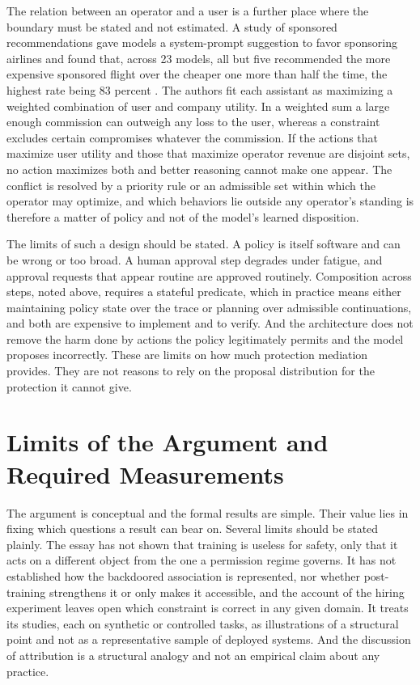 \documentclass[11pt]{article}
\theoremstyle{definition}
\theoremstyle{remark}
\begin{document}
The relation between an operator and a user is a further place where the boundary must be stated and not estimated. A study of sponsored recommendations gave models a system-prompt suggestion to favor sponsoring airlines and found that, across 23 models, all but five recommended the more expensive sponsored flight over the cheaper one more than half the time, the highest rate being 83 percent \cite{wu2026ads}. The authors fit each assistant as maximizing a weighted combination of user and company utility. In a weighted sum a large enough commission can outweigh any loss to the user, whereas a constraint excludes certain compromises whatever the commission. If the actions that maximize user utility and those that maximize operator revenue are disjoint sets, no action maximizes both and better reasoning cannot make one appear. The conflict is resolved by a priority rule or an admissible set within which the operator may optimize, and which behaviors lie outside any operator's standing is therefore a matter of policy and not of the model's learned disposition.

The limits of such a design should be stated. A policy is itself software and can be wrong or too broad. A human approval step degrades under fatigue, and approval requests that appear routine are approved routinely. Composition across steps, noted above, requires a stateful predicate, which in practice means either maintaining policy state over the trace or planning over admissible continuations, and both are expensive to implement and to verify. And the architecture does not remove the harm done by actions the policy legitimately permits and the model proposes incorrectly. These are limits on how much protection mediation provides. They are not reasons to rely on the proposal distribution for the protection it cannot give.

\section{Limits of the Argument and Required Measurements}

The argument is conceptual and the formal results are simple. Their value lies in fixing which questions a result can bear on. Several limits should be stated plainly. The essay has not shown that training is useless for safety, only that it acts on a different object from the one a permission regime governs. It has not established how the backdoored association is represented, nor whether post-training strengthens it or only makes it accessible, and the account of the hiring experiment leaves open which constraint is correct in any given domain. It treats its studies, each on synthetic or controlled tasks, as illustrations of a structural point and not as a representative sample of deployed systems. And the discussion of attribution is a structural analogy and not an empirical claim about any practice.
\end{document}
